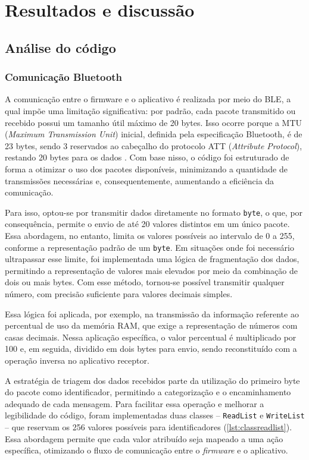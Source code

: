 \chapter[Resultados e discussão]{Resultados e discussão}

\section{Análise do código}
\subsection{Comunicação Bluetooth}

A comunicação entre o firmware e o aplicativo é realizada por meio do BLE, a qual impõe uma limitação significativa: por padrão, cada pacote transmitido ou recebido possui um tamanho útil máximo de 20 bytes. Isso ocorre porque a MTU (\textit{Maximum Transmission Unit}) inicial, definida pela especificação Bluetooth, é de 23 bytes, sendo 3 reservados ao cabeçalho do protocolo ATT (\textit{Attribute Protocol}), restando 20 bytes para os dados \cite{ble_memfault}. Com base nisso, o código foi estruturado de forma a otimizar o uso dos pacotes disponíveis, minimizando a quantidade de transmissões necessárias e, consequentemente, aumentando a eficiência da comunicação.

Para isso, optou-se por transmitir dados diretamente no formato \texttt{byte}, o que, por consequência, permite o envio de até 20 valores distintos em um único pacote. Essa abordagem, no entanto, limita os valores possíveis ao intervalo de 0 a 255, conforme a representação padrão de um \texttt{byte}. Em situações onde foi necessário ultrapassar esse limite, foi implementada uma lógica de fragmentação dos dados, permitindo a representação de valores mais elevados por meio da combinação de dois ou mais bytes. Com esse método, tornou-se possível transmitir qualquer número, com precisão suficiente para valores decimais simples.

Essa lógica foi aplicada, por exemplo, na transmissão da informação referente ao percentual de uso da memória RAM, que exige a representação de números com casas decimais. Nessa aplicação específica, o valor percentual é multiplicado por 100 e, em seguida, dividido em dois bytes para envio, sendo reconstituído com a operação inversa no aplicativo receptor.

A estratégia de triagem dos dados recebidos parte da utilização do primeiro byte do pacote como identificador, permitindo a categorização e o encaminhamento adequado de cada mensagem. Para facilitar essa operação e melhorar a legibilidade do código, foram implementadas duas classes – \texttt{ReadList} e \texttt{WriteList} – que reservam os 256 valores possíveis para identificadores (\autoref{lst:classreadlist}). Essa abordagem permite que cada valor atribuído seja mapeado a uma ação específica, otimizando o fluxo de comunicação entre o \textit{firmware} e o aplicativo.

